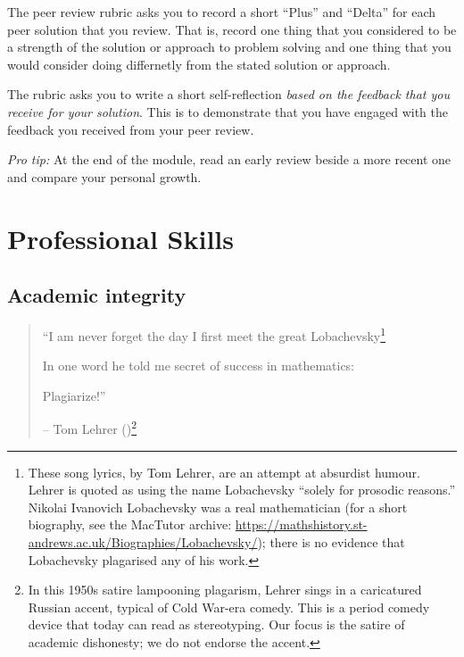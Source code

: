\documentclass[
  a4paper,
  DIV=11,
  numbers=noendperiod,
  oneside]{scrreprt}
\begin{document}
\begin{tcolorbox}[enhanced jigsaw, colframe=quarto-callout-note-color-frame, title=\textcolor{quarto-callout-note-color}{\faInfo}\hspace{0.5em}{Peer review across the module}, breakable, opacityback=0, titlerule=0mm, colbacktitle=quarto-callout-note-color!10!white, toptitle=1mm, colback=white, coltitle=black, toprule=.15mm, bottomtitle=1mm, left=2mm, arc=.35mm, rightrule=.15mm, bottomrule=.15mm, opacitybacktitle=0.6, leftrule=.75mm]

The peer review rubric asks you to record a short ``Plus'' and ``Delta''
for each peer solution that you review. That is, record one thing that
you considered to be a strength of the solution or approach to problem
solving and one thing that you would consider doing differnetly from the
stated solution or approach.

The rubric asks you to write a short self-reflection \emph{based on the
feedback that you receive for your solution}. This is to demonstrate
that you have engaged with the feedback you received from your peer
review.

\emph{Pro tip:} At the end of the module, read an early review beside a
more recent one and compare your personal growth.

\end{tcolorbox}

\part{Professional Skills}

\chapter{Academic integrity}\label{sec-academic-integrity}

\begin{quote}
``I am never forget the day I first meet the great
Lobachevsky\footnote{These song lyrics, by Tom Lehrer, are an attempt at
  absurdist humour. Lehrer is quoted as using the name Lobachevsky
  ``solely for prosodic reasons.'' Nikolai Ivanovich Lobachevsky was a
  real mathematician (for a short biography, see the MacTutor archive:
  \url{https://mathshistory.st-andrews.ac.uk/Biographies/Lobachevsky/});
  there is no evidence that Lobachevsky plagarised any of his work.}

In one word he told me secret of success in mathematics:

Plagiarize!''

-- Tom Lehrer ()\footnote{In this 1950s satire lampooning plagarism, Lehrer sings
  in a caricatured Russian accent, typical of Cold War-era comedy. This
  is a period comedy device that today can read as stereotyping. Our
  focus is the satire of academic dishonesty; we do not endorse the
  accent.}
\end{quote}
\end{document}
